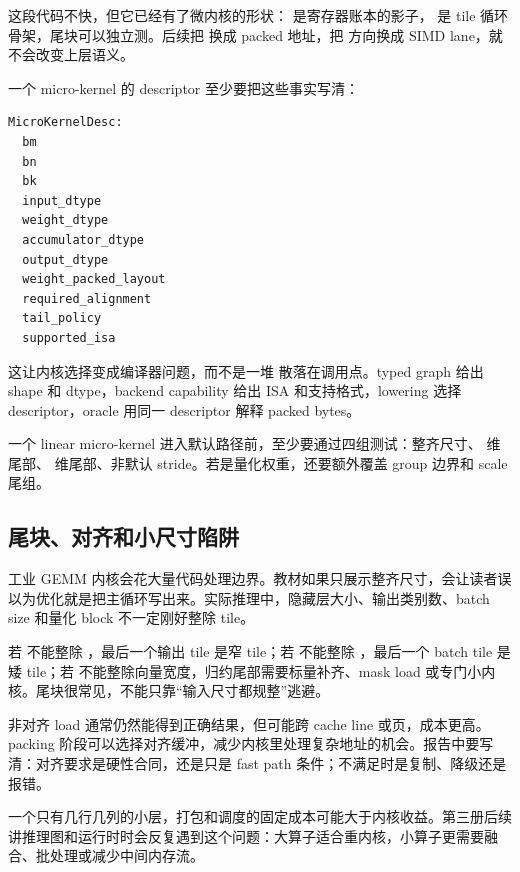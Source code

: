 这段代码不快，但它已经有了微内核的形状： 是寄存器账本的影子， 是 tile 循环骨架，尾块可以独立测。后续把  换成 packed 地址，把  方向换成 SIMD lane，就不会改变上层语义。

一个 micro-kernel 的 descriptor 至少要把这些事实写清：

\begin{lstlisting}[numbers=none,caption={micro-kernel descriptor 的最小字段}]
MicroKernelDesc:
  bm
  bn
  bk
  input_dtype
  weight_dtype
  accumulator_dtype
  output_dtype
  weight_packed_layout
  required_alignment
  tail_policy
  supported_isa
\end{lstlisting}

这让内核选择变成编译器问题，而不是一堆  散落在调用点。typed graph 给出 shape 和 dtype，backend capability 给出 ISA 和支持格式，lowering 选择 descriptor，oracle 用同一 descriptor 解释 packed bytes。

\begin{rubricbox}
一个 linear micro-kernel 进入默认路径前，至少要通过四组测试：整齐尺寸、 维尾部、 维尾部、非默认 stride。若是量化权重，还要额外覆盖 group 边界和 scale 尾组。
\end{rubricbox}

\subsection{尾块、对齐和小尺寸陷阱}

工业 GEMM 内核会花大量代码处理边界。教材如果只展示整齐尺寸，会让读者误以为优化就是把主循环写出来。实际推理中，隐藏层大小、输出类别数、batch size 和量化 block 不一定刚好整除 tile。

 若  不能整除 ，最后一个输出 tile 是窄 tile；若  不能整除 ，最后一个 batch tile 是矮 tile；若  不能整除向量宽度，归约尾部需要标量补齐、mask load 或专门小内核。尾块很常见，不能只靠“输入尺寸都规整”逃避。

 非对齐 load 通常仍然能得到正确结果，但可能跨 cache line 或页，成本更高。packing 阶段可以选择对齐缓冲，减少内核里处理复杂地址的机会。报告中要写清：对齐要求是硬性合同，还是只是 fast path 条件；不满足时是复制、降级还是报错。

 一个只有几行几列的小层，打包和调度的固定成本可能大于内核收益。第三册后续讲推理图和运行时时会反复遇到这个问题：大算子适合重内核，小算子更需要融合、批处理或减少中间内存流。

